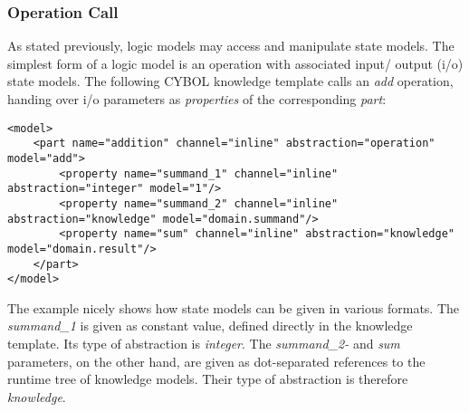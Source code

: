 %
%
%
%
%
%
%

\subsubsection{Operation Call}
\label{operation_call_heading}

As stated previously, logic models may access and manipulate state models. The
simplest form of a logic model is an operation with associated input/ output
(i/o) state models. The following CYBOL knowledge template calls an \emph{add}
operation, handing over i/o parameters as \emph{properties} of the
corresponding \emph{part}:

\begin{scriptsize}
    \begin{verbatim}
<model>
    <part name="addition" channel="inline" abstraction="operation" model="add">
        <property name="summand_1" channel="inline" abstraction="integer" model="1"/>
        <property name="summand_2" channel="inline" abstraction="knowledge" model="domain.summand"/>
        <property name="sum" channel="inline" abstraction="knowledge" model="domain.result"/>
    </part>
</model>
    \end{verbatim}
\end{scriptsize}

The example nicely shows how state models can be given in various formats. The
\emph{summand\_1} is given as constant value, defined directly in the knowledge
template. Its type of abstraction is \emph{integer}. The \emph{summand\_2-} and
\emph{sum} parameters, on the other hand, are given as dot-separated references
to the runtime tree of knowledge models. Their type of abstraction is therefore
\emph{knowledge}.
